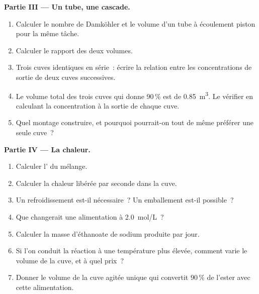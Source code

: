 \begin{problem}
\medskip
\noindent\textbf{Partie III --- Un tube, une cascade.}
\begin{enumerate}[resume]
  \item Calculer le nombre de Damköhler et le volume d'un tube à écoulement piston pour
        la même tâche.
  \item Calculer le rapport des deux volumes.
  \item Trois cuves identiques en série~: écrire la relation entre les concentrations de
        sortie de deux cuves successives.
  \item Le volume total des trois cuves qui donne 90\,\% est de
        \qty{0.85}{m^3}. Le vérifier en calculant la concentration à la sortie de chaque
        cuve.
  \item Quel montage construire, et pourquoi pourrait-on tout de même préférer une seule
        cuve~?
\end{enumerate}

\medskip
\noindent\textbf{Partie IV --- La chaleur.}
\begin{enumerate}[resume]
  \item Calculer l' du mélange.
  \item Calculer la chaleur libérée par seconde dans la cuve.
  \item Un refroidissement est-il nécessaire~? Un emballement est-il possible~?
  \item Que changerait une alimentation à \qty{2.0}{mol/L}~?
  \item Calculer la masse d'éthanoate de sodium produite par jour.
  \item Si l'on conduit la réaction à une température plus élevée, comment varie le volume
        de la cuve, et à quel prix~?
  \item Donner le volume de la cuve agitée unique qui convertit 90\,\% de
        l'ester avec cette alimentation.
\end{enumerate}
\end{problem}
